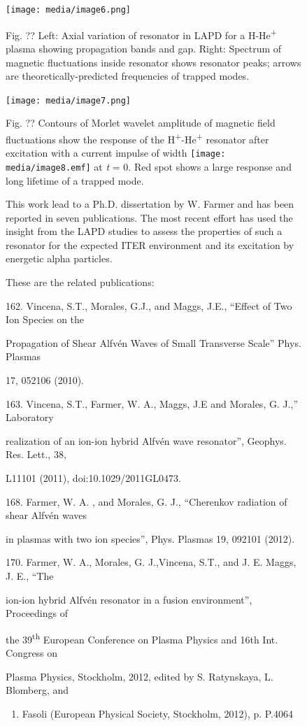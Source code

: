 \documentclass[11pt]{article}
\begin{document}
\begin{description}
\begin{figure}[!htbp]
\texttt{[image: media/image6.png]}

Fig. ?? Left: Axial variation of resonator in LAPD for a
H-He\textsuperscript{+} plasma showing propagation bands and gap. Right:
Spectrum of magnetic fluctuations inside resonator shows resonator
peaks; arrows are theoretically-predicted frequencies of trapped modes.

\texttt{[image: media/image7.png]}

Fig. ?? Contours of Morlet wavelet amplitude of magnetic field
fluctuations show the response of the
H\textsuperscript{+}-He\textsuperscript{+} resonator after excitation
with a current impulse of width \texttt{[image: media/image8.emf]} at
\emph{t} = 0. Red spot shows a large response and long lifetime of a
trapped mode.

This work lead to a Ph.D. dissertation by W. Farmer and has been
reported in seven publications. The most recent effort has used the
insight from the LAPD studies to assess the properties of such a
resonator for the expected ITER environment and its excitation by
energetic alpha particles.

These are the related publications:

162. Vincena, S.T., Morales, G.J., and Maggs, J.E., ``Effect of Two Ion
Species on the

Propagation of Shear Alfvén Waves of Small Transverse Scale'' Phys.
Plasmas

17, 052106 (2010).

163. Vincena, S.T., Farmer, W. A., Maggs, J.E and Morales, G. J.,''
Laboratory

realization of an ion-ion hybrid Alfvén wave resonator'', Geophys. Res.
Lett., 38,

L11101 (2011), doi:10.1029/2011GL0473.

168. Farmer, W. A. , and Morales, G. J., ``Cherenkov radiation of shear
Alfvén waves

in plasmas with two ion species'', Phys. Plasmas 19, 092101 (2012).

170. Farmer, W. A., Morales, G. J.,Vincena, S.T., and J. E. Maggs, J.
E., ``The

ion-ion hybrid Alfvén resonator in a fusion environment'', Proceedings
of

the 39\textsuperscript{th} European Conference on Plasma Physics and
16th Int. Congress on

Plasma Physics, Stockholm, 2012, edited by S. Ratynskaya, L. Blomberg,
and


\begin{enumerate}
\def\labelenumi{\Alph{enumi}.}
\item
  Fasoli (European Physical Society, Stockholm, 2012), p. P.4064
\end{enumerate}



\end{figure}
\end{description}
\end{document}
